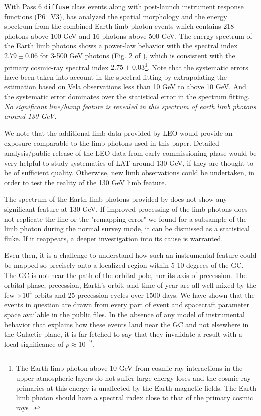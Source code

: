 \documentclass[aps,twocolumn,prd,superscriptaddress,showpacs,nofootinbib,fixfloat]{revtex4}
\begin{document}
With Pass 6 \texttt{diffuse} class events along with
post-launch instrument response functions (P6\_V3),
\cite{FermiLimb} has analyzed the spatial morphology and the
energy spectrum from the combined Earth limb photon events
which contains 218 photons above 100 GeV and 16 photons
above 500 GeV. The energy spectrum of the Earth limb photons
shows a power-law behavior with the spectral index $2.79\pm
0.06$ for 3-500 GeV photons (Fig. 2 of \cite{FermiLimb}),
which is consistent with the primary cosmic-ray spectral
index $2.75\pm 0.03$\footnote{The Earth limb photon above 10
  GeV from cosmic ray interactions in the upper atmospheric
  layers do not suffer large energy loses and the cosmic-ray
  primaries at this energy is unaffected by the Earth
  magnetic fields. The Earth limb photon should have a
  spectral index close to that of the primary cosmic
  rays~\cite{FermiLimb}. }. Note that the systematic errors
have been taken into account in the spectral fitting by
extrapolating the estimation based on Vela observations less
than 10 GeV to above 10 GeV. And the systematic error
dominates over the statistical error in the spectrum
fitting. \emph{No significant line/bump feature is revealed
  in this spectrum of earth limb photons around 130 GeV.}


We note that the additional limb data provided by LEO would
provide an exposure comparable to the limb photons used in
this paper. Detailed analysis/public release of the LEO data
from early commissioning phase would be very helpful to
study systematics of LAT around 130 GeV, if they are thought
to be of sufficient quality.  Otherwise, new limb
observations could be undertaken, in order to test the
reality of the 130 GeV limb feature.

The spectrum of the Earth limb photons provided by
\citep{FermiLimb} does not show any significant feature at
130 GeV. If improved processing of the limb photons does not
replicate the line or the "remapping error" we found for a
subsample of the limb photon during the normal survey mode,
it can be dismissed as a statistical fluke.  If it
reappears, a deeper investigation into its cause is
warranted.

Even then, it is a challenge to understand how such an
instrumental feature could be mapped so precisely onto a
localized region within 5-10 degrees of the GC.  The GC is
not near the path of the orbital pole, nor its axis of
precession.  The orbital phase, precession, Earth's orbit,
and time of year are all well mixed by the few $\times10^4$
orbits and 25 precession cycles over 1500 days.  We have
shown that the events in question are drawn from every part
of event and spacecraft parameter space available in the
public files.  In the absence of any model of instrumental
behavior that explains how these events land near the GC and
not elsewhere in the Galactic plane, it is far fetched to
say that they invalidate a result with a local significance
of $p\approx10^{-9}$.
\end{document}
